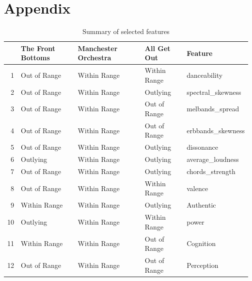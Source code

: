 \documentclass{article}\usepackage[]{graphicx}\usepackage[]{xcolor}
\begin{document}
\begin{multicols}{2}
\vspace{2em}

\begin{tiny}

\end{tiny}
\end{multicols}

\newpage
\onecolumn
\section{Appendix}
\begin{table}[ht]
\centering
\begin{tabular}{rllll}
  \hline
 & The Front Bottoms & Manchester Orchestra & All Get Out & Feature \\ 
  \hline
1 & Out of Range & Within Range & Within Range & danceability \\ 
  2 & Out of Range & Within Range & Outlying & spectral\_skewness \\ 
  3 & Out of Range & Within Range & Out of Range & melbands\_spread \\ 
  4 & Out of Range & Within Range & Out of Range & erbbands\_skewness \\ 
  5 & Out of Range & Within Range & Outlying & dissonance \\ 
  6 & Outlying & Within Range & Outlying & average\_loudness \\ 
  7 & Out of Range & Within Range & Outlying & chords\_strength \\ 
  8 & Out of Range & Within Range & Within Range & valence \\ 
  9 & Within Range & Within Range & Outlying & Authentic \\ 
  10 & Outlying & Within Range & Within Range & power \\ 
  11 & Within Range & Within Range & Out of Range & Cognition \\ 
  12 & Out of Range & Within Range & Out of Range & Perception \\ 
   \hline
\end{tabular}
\caption{Summary of selected features}
\end{table}
\end{document}
